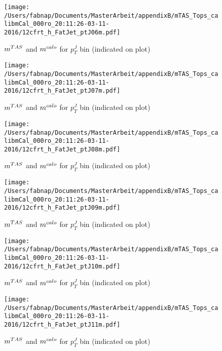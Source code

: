 \begin{figure}
 
\texttt{[image: /Users/fabnap/Documents/MasterArbeit/appendixB/mTAS\_Tops\_calibmCal\_000ro\_20:11:26-03-11-2016/12cfrt\_h\_FatJet\_ptJ06m.pdf]}
\caption{$m^{TAS}$ and $m^{calo}$ for $p_{T}^{J}$ bin (indicated on plot) }
 
\end{figure}
\begin{figure}
 
\texttt{[image: /Users/fabnap/Documents/MasterArbeit/appendixB/mTAS\_Tops\_calibmCal\_000ro\_20:11:26-03-11-2016/12cfrt\_h\_FatJet\_ptJ07m.pdf]}
\caption{$m^{TAS}$ and $m^{calo}$ for $p_{T}^{J}$ bin (indicated on plot) }
 
\end{figure}
 
\begin{figure}
 
\texttt{[image: /Users/fabnap/Documents/MasterArbeit/appendixB/mTAS\_Tops\_calibmCal\_000ro\_20:11:26-03-11-2016/12cfrt\_h\_FatJet\_ptJ08m.pdf]}
\caption{$m^{TAS}$ and $m^{calo}$ for $p_{T}^{J}$ bin (indicated on plot) }
 
\end{figure}
 
\begin{figure}
 
\texttt{[image: /Users/fabnap/Documents/MasterArbeit/appendixB/mTAS\_Tops\_calibmCal\_000ro\_20:11:26-03-11-2016/12cfrt\_h\_FatJet\_ptJ09m.pdf]}
\caption{$m^{TAS}$ and $m^{calo}$ for $p_{T}^{J}$ bin (indicated on plot) }
 
\end{figure}
 
\begin{figure}
 
\texttt{[image: /Users/fabnap/Documents/MasterArbeit/appendixB/mTAS\_Tops\_calibmCal\_000ro\_20:11:26-03-11-2016/12cfrt\_h\_FatJet\_ptJ10m.pdf]}
\caption{$m^{TAS}$ and $m^{calo}$ for $p_{T}^{J}$ bin (indicated on plot) }
 
\end{figure}
 
\begin{figure}
 
\texttt{[image: /Users/fabnap/Documents/MasterArbeit/appendixB/mTAS\_Tops\_calibmCal\_000ro\_20:11:26-03-11-2016/12cfrt\_h\_FatJet\_ptJ11m.pdf]}
\caption{$m^{TAS}$ and $m^{calo}$ for $p_{T}^{J}$ bin (indicated on plot) }
 
\end{figure}
 
